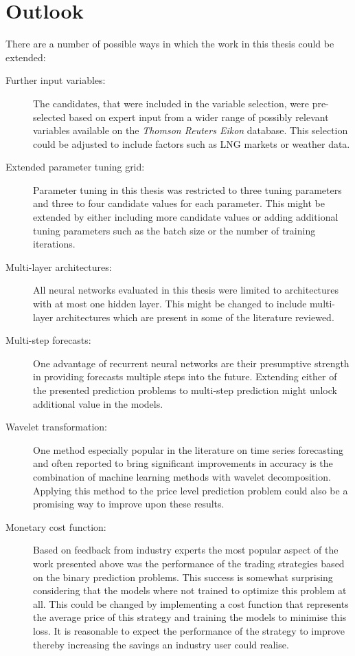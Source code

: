 \section{Outlook}
There are a number of possible ways in which the work in this thesis could be extended:
\begin{description}
\item[Further input variables:] The candidates, that were included in the variable selection, were pre-selected based on expert input from a wider range of possibly relevant variables available on the \textit{Thomson Reuters Eikon} database. This selection could be adjusted to include factors such as LNG markets or weather data. 
\item[Extended parameter tuning grid:] Parameter tuning in this thesis was restricted to three tuning parameters and three to four candidate values for each parameter. This might be extended by either including more candidate values or adding additional tuning parameters such as the batch size or the number of training iterations.
\item[Multi-layer architectures:] All neural networks evaluated in this thesis were limited to architectures with at most one hidden layer. This might be changed to include multi-layer architectures which are present in some of the literature reviewed. 
\item[Multi-step forecasts:] One advantage of recurrent neural networks are their presumptive strength in providing forecasts multiple steps into the future. Extending either of the presented prediction problems to multi-step prediction might unlock additional value in the models.
\item[Wavelet transformation:] One method especially popular in the literature on time series forecasting and often reported to bring significant improvements in accuracy is the combination of machine learning methods with wavelet decomposition. Applying this method to the price level prediction problem could also be a promising way to improve upon these results.
\item[Monetary cost function:] Based on feedback from industry experts the most popular aspect of the work presented above was the performance of the trading strategies based on the binary prediction problems. This success is somewhat surprising considering that the models where not trained to optimize this problem at all. This could be changed by implementing a cost function that represents the average price of this strategy and training the models to minimise this loss. It is reasonable to expect the performance of the strategy to improve thereby increasing the savings an industry user could realise.
\end{description}
